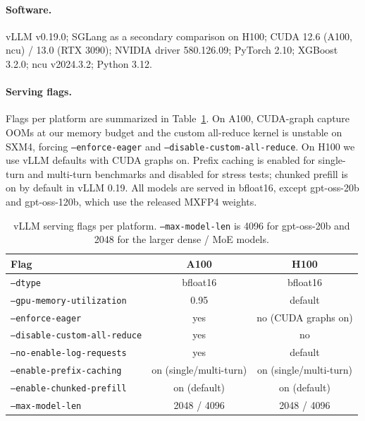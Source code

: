 \paragraph{Software.} vLLM v0.19.0; SGLang as a secondary comparison on H100; CUDA 12.6 (A100, ncu) / 13.0 (RTX 3090); NVIDIA driver 580.126.09; PyTorch 2.10; XGBoost 3.2.0; ncu v2024.3.2; Python 3.12.

\paragraph{Serving flags.} Flags per platform are summarized in Table~\ref{tab:serving_flags}. On A100, CUDA-graph capture OOMs at our memory budget and the custom all-reduce kernel is unstable on SXM4, forcing \texttt{--enforce-eager} and \texttt{--disable-custom-all-reduce}. On H100 we use vLLM defaults with CUDA graphs on. Prefix caching is enabled for single-turn and multi-turn benchmarks and disabled for stress tests; chunked prefill is on by default in vLLM 0.19. All models are served in bfloat16, except gpt-oss-20b and gpt-oss-120b, which use the released MXFP4 weights.

\begin{table}[h]
\caption{vLLM serving flags per platform. \texttt{--max-model-len} is 4096 for gpt-oss-20b and 2048 for the larger dense / MoE models.}
\label{tab:serving_flags}
\centering
\small
\begin{tabular}{lcc}
\toprule
\textbf{Flag} & \textbf{A100} & \textbf{H100} \\
\midrule
\texttt{--dtype}                     & bfloat16   & bfloat16   \\
\texttt{--gpu-memory-utilization}    & 0.95       & default    \\
\texttt{--enforce-eager}             & yes        & no (CUDA graphs on) \\
\texttt{--disable-custom-all-reduce} & yes        & no         \\
\texttt{--no-enable-log-requests}    & yes        & default    \\
\texttt{--enable-prefix-caching}     & on (single/multi-turn) & on (single/multi-turn) \\
\texttt{--enable-chunked-prefill}    & on (default) & on (default) \\
\texttt{--max-model-len}             & 2048 / 4096 & 2048 / 4096 \\
\bottomrule
\end{tabular}
\end{table}

